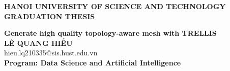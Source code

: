 \documentclass[Main.tex]{subfiles}
\begin{document}
\begin{titlepage}
\thispagestyle{empty}
\begin{center}

{\textbf{\large{HANOI UNIVERSITY OF SCIENCE AND TECHNOLOGY }}}\\[4cm]

{\textbf{\huge{GRADUATION THESIS}}}\\[1cm]
{\textbf{\Large{Generate high quality topology-aware mesh with TRELLIS}}\\[1cm]

{\textbf{\large{LÊ QUANG HIẾU}}}\\
{\large{hieu.lq210335@sis.hust.edu.vn}}\\[0.5cm]

{\textbf{\large{Program: Data Science and Artificial Intelligence}}}\\

\vspace{4cm}
\begin{table}[H]
\centering
{}
\end{table}}
\end{center}



\end{titlepage}
\end{document}
